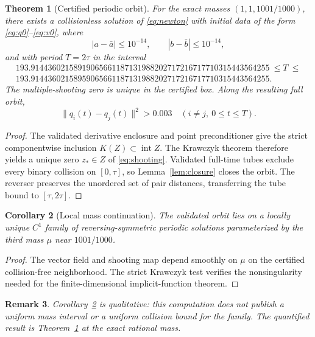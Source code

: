\documentclass[11pt]{article}
\newtheorem{theorem}{Theorem}
\newtheorem{corollary}[theorem]{Corollary}
\newtheorem{remark}[theorem]{Remark}
\begin{document}
\begin{theorem}[Certified periodic orbit]\label{thm:main}
For the exact masses $(1,1,1001/1000)$, there exists a collisionless solution of \eqref{eq:newton} with initial data of the form \eqref{eq:q0}--\eqref{eq:v0}, where
\[
  |a-\bar a|\le10^{-14},\qquad |b-\bar b|\le10^{-14},
\]
and with period $T=2\tau$ in the interval
\begin{equation}
\begin{split}
193.91443602158919065661187131988202717216717710315443564255
\ \le T\ \le{}\\
193.91443602158959065661187131988202717216717710315443564255.
\end{split} \label{eq:period-interval}
\end{equation}
The multiple-shooting zero is unique in the certified box. Along the resulting full orbit,
\begin{equation}
  \lVert q_i(t)-q_j(t)\rVert^2>0.003
  \quad (i\ne j,\ 0\le t\le T). \label{eq:collision-bound}
\end{equation}
\end{theorem}

\begin{proof}
The validated derivative enclosure and point preconditioner give the strict componentwise inclusion $K(Z)\subset\operatorname{int}Z$. The Krawczyk theorem therefore yields a unique zero $z_\ast\in Z$ of \eqref{eq:shooting}. Validated full-time tubes exclude every binary collision on $[0,\tau]$, so Lemma~\ref{lem:closure} closes the orbit. The reverser preserves the unordered set of pair distances, transferring the tube bound to $[\tau,2\tau]$.
\end{proof}

\begin{corollary}[Local mass continuation]\label{cor:family}
The validated orbit lies on a locally unique $C^1$ family of reversing-symmetric periodic solutions parameterized by the third mass $\mu$ near $1001/1000$.
\end{corollary}

\begin{proof}
The vector field and shooting map depend smoothly on $\mu$ on the certified collision-free neighborhood. The strict Krawczyk test verifies the nonsingularity needed for the finite-dimensional implicit-function theorem.
\end{proof}

\begin{remark}
Corollary~\ref{cor:family} is qualitative: this computation does not publish a uniform mass interval or a uniform collision bound for the family. The quantified result is Theorem~\ref{thm:main} at the exact rational mass.
\end{remark}
\end{document}
